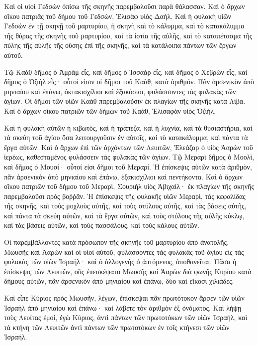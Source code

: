 {Καὶ οἱ υἱοὶ Γεδσὼν ὀπίσω τῆς σκηνῆς παρεμβαλοῦσι παρὰ θάλασσαν.
Καὶ ὁ ἄρχων οἴκου πατριᾶς τοῦ δήμου τοῦ Γεδσὼν, Ἑλισὰφ υἱὸς Δαήλ.
Καὶ ἡ φυλακὴ υἱῶν Γεδσὼν ἐν τῇ σκηνῇ τοῦ μαρτυρίου, ἡ σκηνὴ καὶ τὸ κάλυμμα, καὶ τὸ κατακάλυμμα τῆς θύρας τῆς σκηνῆς τοῦ μαρτυρίου,
καὶ τὰ ἱστία τῆς αὐλῆς, καὶ τὸ καταπέτασμα τῆς πύλης τῆς αὐλῆς τῆς οὔσης ἐπὶ τῆς σκηνῆς, καὶ τὰ κατάλοιπα πάντων τῶν ἔργων αὐτοῦ.
\par }{\PP {}Τῷ Καὰθ δῆμος ὁ Ἀμρὰμ εἷς, καὶ δῆμος ὁ Ἰσσαὰρ εἷς, καὶ δῆμος ὁ Χεβρὼν εἷς, καὶ δῆμος ὁ Ὀζιὴλ εἷς· οὗτοί εἰσιν οἱ δῆμοι τοῦ Καὰθ, κατὰ ἀριθμόν.
Πᾶν ἀρσενικὸν ἀπὸ μηνιαίου καὶ ἐπάνω, ὀκτακισχίλιοι καὶ ἑξακόσιοι, φυλάσσοντες τὰς φυλακὰς τῶν ἁγίων.
Οἱ δῆμοι τῶν υἱῶν Καὰθ παρεμβαλοῦσιν ἐκ πλαγίων τῆς σκηνῆς κατὰ Λίβα.
Καὶ ὁ ἄρχων οἴκου πατριῶν τῶν δήμων τοῦ Καὰθ, Ἑλισαφὰν υἱὸς Ὀζιήλ.
\par }{\PP {}Καὶ ἡ φυλακὴ αὐτῶν ἡ κιβωτὸς, καὶ ἡ τράπεζα, καὶ ἡ λυχνία, καὶ τὰ θυσιαστήρια, καὶ τὰ σκεύη τοῦ ἁγίου ὅσα λειτουργοῦσιν ἐν αὐτοῖς, καὶ τὸ κατακάλυμμα, καὶ πάντα τὰ ἔργα αὐτῶν.
Καὶ ὁ ἄρχων ἐπὶ τῶν ἀρχόντων τῶν Λευιτῶν, Ἐλεάζαρ ὁ υἱὸς Ἀαρὼν τοῦ ἱερέως, καθεσταμένος φυλάσσειν τὰς φυλακὰς τῶν ἁγίων.
Τῷ Μεραρὶ δῆμος ὁ Μοολὶ, καὶ δῆμος ὁ Μουσί· οὗτοί εἰσι δῆμοι τοῦ Μεραρί.
Ἡ ἐπίσκεψις αὐτῶν κατὰ ἀριθμὸν, πᾶν ἀρσενικὸν ἀπὸ μηνιαίου καὶ ἐπάνω, ἑξακισχίλιοι καὶ πεντήκοντα.
Καὶ ὁ ἄρχων οἴκου πατριῶν τοῦ δήμου τοῦ Μεραρὶ, Σουριὴλ υἱὸς Ἀβιχαίλ· ἐκ πλαγίων τῆς σκηνῆς παρεμβαλοῦσι πρὸς βοῤῥᾶν.
Ἡ ἐπίσκεψις τῆς φυλακῆς υἱῶν Μεραρὶ, τὰς κεφαλίδας τῆς σκηνῆς, καὶ τοὺς μοχλοὺς αὐτῆς, καὶ τοὺς στύλους αὐτῆς, καὶ τὰς βάσεις αὐτῆς, καὶ πάντα τὰ σκεύη αὐτῶν, καὶ τὰ ἔργα αὐτῶν,
καὶ τοὺς στύλους τῆς αὐλῆς κύκλῳ, καὶ τὰς βάσεις αὐτῶν, καὶ τοὺς πασσάλους, καὶ τοὺς κάλους αὐτῶν.
\par }{\PP {}Οἱ παρεμβάλλοντες κατὰ πρόσωπον τῆς σκηνῆς τοῦ μαρτυρίου ἀπὸ ἀνατολῆς, Μωυσῆς καὶ Ἀαρὼν καὶ οἱ υἱοὶ αὐτοῦ, φυλάσσοντες τὰς φυλακὰς τοῦ ἁγίου εἰς τὰς φυλακὰς τῶν υἱῶν Ἰσραήλ· καὶ ὁ ἀλλογενὴς ὁ ἁπτόμενος, ἀποθανεῖται.
Πᾶσα ἡ ἐπίσκεψις τῶν Λευιτῶν, οὓς ἐπεσκέψατο Μωυσῆς καὶ Ἀαρὼν διὰ φωνῆς Κυρίου κατὰ δήμους αὐτῶν, πᾶν ἀρσενικὸν ἀπὸ μηνιαίου καὶ ἐπάνω, δύο καὶ εἴκοσι χιλιάδες.
\par }{\PP {}Καὶ εἶπε Κύριος πρὸς Μωυσῆν, λέγων, ἐπίσκεψαι πᾶν πρωτότοκον ἄρσεν τῶν υἱῶν Ἰσραὴλ ἀπὸ μηνιαίου καὶ ἐπάνω· καὶ λάβετε τὸν ἀριθμὸν ἐξ ὀνόματος.
Καὶ λήψῃ τοὺς Λευίτας ἐμοί, ἐγὼ Κύριος, ἀντὶ πάντων τῶν πρωτοτόκων τῶν υἱῶν Ἰσραήλ, καὶ τὰ κτήνη τῶν Λευιτῶν ἀντὶ πάντων τῶν πρωτοτόκων ἐν τοῖς κτήνεσι τῶν υἱῶν Ἰσραήλ.
}
